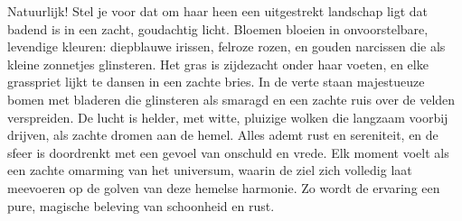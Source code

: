 Natuurlijk! Stel je voor dat om haar heen een uitgestrekt landschap ligt dat badend is in een zacht, goudachtig licht. Bloemen bloeien in onvoorstelbare, levendige kleuren: diepblauwe irissen, felroze rozen, en gouden narcissen die als kleine zonnetjes glinsteren. Het gras is zijdezacht onder haar voeten, en elke grasspriet lijkt te dansen in een zachte bries.
In de verte staan majestueuze bomen met bladeren die glinsteren als smaragd en een zachte ruis over de velden verspreiden. De lucht is helder, met witte, pluizige wolken die langzaam voorbij drijven, als zachte dromen aan de hemel. Alles ademt rust en sereniteit, en de sfeer is doordrenkt met een gevoel van onschuld en vrede. Elk moment voelt als een zachte omarming van het universum, waarin de ziel zich volledig laat meevoeren op de golven van deze hemelse harmonie. Zo wordt de ervaring een pure, magische beleving van schoonheid en rust.
